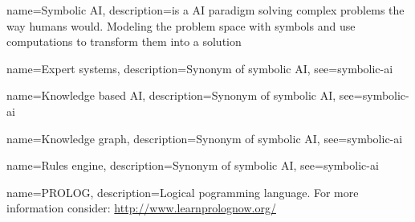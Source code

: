 


{
  name={Symbolic AI},
  description={is a AI paradigm solving complex problems the way humans would. Modeling the problem space with symbols and use computations to transform them into a solution}
}

{
  name={Expert systems},
  description={Synonym of symbolic AI},
  see={symbolic-ai}
}

{
  name={Knowledge based AI},
  description={Synonym of symbolic AI},
  see={symbolic-ai}
}

{
  name={Knowledge graph},
  description={Synonym of symbolic AI},
  see={symbolic-ai}
}

{
  name={Rules engine},
  description={Synonym of symbolic AI},
  see={symbolic-ai}
}

{
  name={PROLOG},
  description={Logical pogramming language. For more information consider: \url{http://www.learnprolognow.org/}}
}